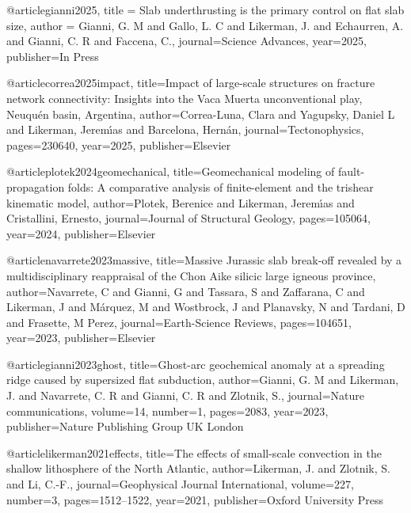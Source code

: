 

@article{gianni2025,
    title = {Slab underthrusting is the primary control on flat slab size},   
    author = {Gianni, G. M and Gallo, L. C and Likerman, J. and Echaurren, A. and Gianni, C. R and Faccena, C.},
    journal={Science Advances},
    year={2025},
    publisher={In Press}
}

@article{correa2025impact,
  title={Impact of large-scale structures on fracture network connectivity: Insights into the Vaca Muerta unconventional play, Neuqu{\'e}n basin, Argentina},
  author={Correa-Luna, Clara and Yagupsky, Daniel L and Likerman, Jerem{\'\i}as and Barcelona, Hern{\'a}n},
  journal={Tectonophysics},
  pages={230640},
  year={2025},
  publisher={Elsevier}
}

@article{plotek2024geomechanical,
  title={Geomechanical modeling of fault-propagation folds: A comparative analysis of finite-element and the trishear kinematic model},
  author={Plotek, Berenice and Likerman, Jerem{\'\i}as and Cristallini, Ernesto},
  journal={Journal of Structural Geology},
  pages={105064},
  year={2024},
  publisher={Elsevier}
}


@article{navarrete2023massive,
  title={Massive Jurassic slab break-off revealed by a multidisciplinary reappraisal of the Chon Aike silicic large igneous province},
  author={Navarrete, C and Gianni, G and Tassara, S and Zaffarana, C and Likerman, J and M{\'a}rquez, M and Wostbrock, J and Planavsky, N and Tardani, D and Frasette, M Perez},
  journal={Earth-Science Reviews},
  pages={104651},
  year={2023},
  publisher={Elsevier}
}


@article{gianni2023ghost,
  title={Ghost-arc geochemical anomaly at a spreading ridge caused by supersized flat subduction},
  author={Gianni, G. M and Likerman, J. and Navarrete, C. R and Gianni, C. R and Zlotnik, S.},
  journal={Nature communications},
  volume={14},
  number={1},
  pages={2083},
  year={2023},
  publisher={Nature Publishing Group UK London}
}


@article{likerman2021effects,
  title={The effects of small-scale convection in the shallow lithosphere of the North Atlantic},
  author={Likerman, J. and Zlotnik, S. and Li, C.-F.},
  journal={Geophysical Journal International},
  volume={227},
  number={3},
  pages={1512--1522},
  year={2021},
  publisher={Oxford University Press}
}

